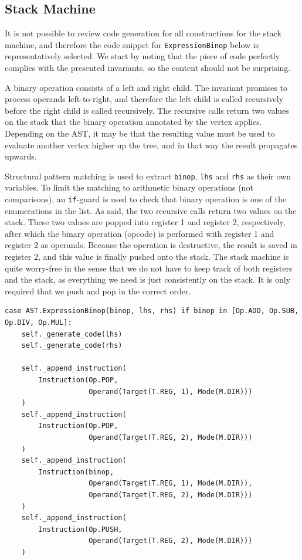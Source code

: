 \subsection{Stack Machine}
It is not possible to review code generation for all constructions for the stack machine, and therefore the code snippet for \texttt{ExpressionBinop} below is representatively selected. We start by noting that the piece of code perfectly complies with the presented invariants, so the content should not be surprising.

A binary operation consists of a left and right child. The invariant promises to process operands left-to-right, and therefore the left child is called recursively before the right child is called recursively. The recursive calls return two values on the stack that the binary operation annotated by the vertex applies. Depending on the AST, it may be that the resulting value must be used to evaluate another vertex higher up the tree, and in that way the result propagates upwards.

Structural pattern matching is used to extract \texttt{binop}, \texttt{lhs} and \texttt{rhs} as their own variables. To limit the matching to arithmetic binary operations (not comparisons), an \texttt{if}-guard is used to check that binary operation is one of the enumerations in the list. As said, the two recursive calls return two values on the stack. These two values are popped into register 1 and register 2, respectively, after which the binary operation (opcode) is performed with register 1 and register 2 as operands. Because the operation is destructive, the result is saved in register 2, and this value is finally pushed onto the stack. The stack machine is quite worry-free in the sense that we do not have to keep track of both registers and the stack, as everything we need is just consistently on the stack. It is only required that we push and pop in the correct order.

\begin{verbatim}
case AST.ExpressionBinop(binop, lhs, rhs) if binop in [Op.ADD, Op.SUB, Op.DIV, Op.MUL]:
    self._generate_code(lhs)
    self._generate_code(rhs)

    self._append_instruction(
        Instruction(Op.POP,
                    Operand(Target(T.REG, 1), Mode(M.DIR)))
    )
    self._append_instruction(
        Instruction(Op.POP,
                    Operand(Target(T.REG, 2), Mode(M.DIR)))
    )
    self._append_instruction(
        Instruction(binop,
                    Operand(Target(T.REG, 1), Mode(M.DIR)),
                    Operand(Target(T.REG, 2), Mode(M.DIR)))
    )
    self._append_instruction(
        Instruction(Op.PUSH,
                    Operand(Target(T.REG, 2), Mode(M.DIR)))
    )
\end{verbatim}

